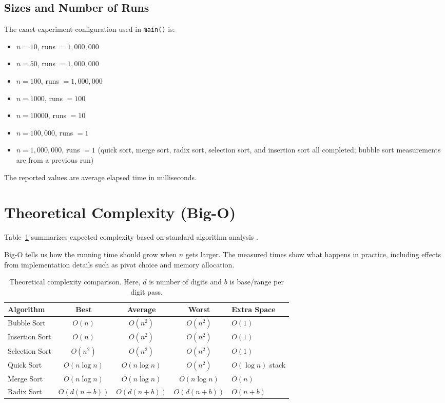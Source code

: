 \documentclass[11pt,a4paper]{article}
\begin{document}
\subsection{Sizes and Number of Runs}
The exact experiment configuration used in \texttt{main()} is:
\begin{itemize}
    \item \(n=10\), runs \(=1{,}000{,}000\)
    \item \(n=50\), runs \(=1{,}000{,}000\)
    \item \(n=100\), runs \(=1{,}000{,}000\)
    \item \(n=1000\), runs \(=100\)
    \item \(n=10000\), runs \(=10\)
    \item \(n=100{,}000\), runs \(=1\)
    \item \(n=1{,}000{,}000\), runs \(=1\) (quick sort, merge sort, radix sort, selection sort, and insertion sort all completed; bubble sort measurements are from a previous run)
\end{itemize}

The reported values are average elapsed time in milliseconds.

\section{Theoretical Complexity (Big-O)}
Table~\ref{tab:complexity} summarizes expected complexity based on standard algorithm analysis \cite{cormen2009,knuth1998}.

Big-O tells us how the running time should grow when \(n\) gets larger. The measured times show what happens in practice, including effects from implementation details such as pivot choice and memory allocation.

\begin{table}[H]
\centering
\begin{tabular}{>{\raggedright\arraybackslash}p{3cm}ccc>{\raggedright\arraybackslash}p{3cm}}
\toprule
Algorithm & Best & Average & Worst & Extra Space \\
\midrule
Bubble Sort & \(O(n)\) & \(O(n^2)\) & \(O(n^2)\) & \(O(1)\) \\
Insertion Sort & \(O(n)\) & \(O(n^2)\) & \(O(n^2)\) & \(O(1)\) \\
Selection Sort & \(O(n^2)\) & \(O(n^2)\) & \(O(n^2)\) & \(O(1)\) \\
Quick Sort & \(O(n\log n)\) & \(O(n\log n)\) & \(O(n^2)\) & \(O(\log n)\) stack \\
Merge Sort & \(O(n\log n)\) & \(O(n\log n)\) & \(O(n\log n)\) & \(O(n)\) \\
Radix Sort & \(O(d(n+b))\) & \(O(d(n+b))\) & \(O(d(n+b))\) & \(O(n+b)\) \\
\bottomrule
\end{tabular}
\caption{Theoretical complexity comparison. Here, \(d\) is number of digits and \(b\) is base/range per digit pass.}
\label{tab:complexity}
\end{table}
\end{document}
